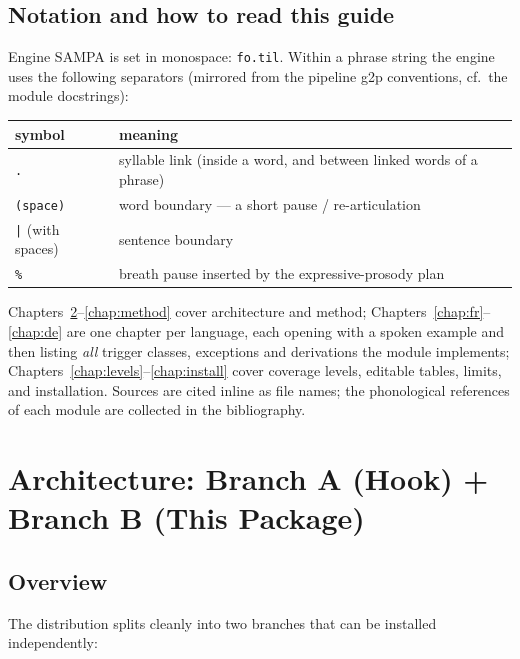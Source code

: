 \documentclass[11pt,a4paper]{report}
\newcommand{\smp}[1]{\texttt{#1}}          %
\begin{document}
\section{Notation and how to read this guide}

Engine SAMPA is set in monospace: \smp{fo.til}. Within a phrase string the
engine uses the following separators (mirrored from the pipeline g2p
conventions, cf.\ the module docstrings):

\begin{center}
\begin{tabular}{@{}ll@{}}
\toprule
symbol & meaning \\
\midrule
\smp{.} & syllable link (inside a word, and between linked words of a phrase) \\
\smp{(space)} & word boundary — a short pause / re-articulation \\
\smp{|} (with spaces) & sentence boundary \\
\smp{\%} & breath pause inserted by the expressive-prosody plan \\
\bottomrule
\end{tabular}
\end{center}

Chapters~\ref{chap:arch}–\ref{chap:method} cover architecture and method;
Chapters~\ref{chap:fr}–\ref{chap:de} are one chapter per language, each
opening with a spoken example and then listing \emph{all} trigger classes,
exceptions and derivations the module implements;
Chapters~\ref{chap:levels}–\ref{chap:install} cover coverage levels, editable
tables, limits, and installation. Sources are cited inline as file names; the
phonological references of each module are collected in the bibliography.

\chapter{Architecture: Branch A (Hook) + Branch B (This Package)}
\label{chap:arch}

\section{Overview}

The distribution splits cleanly into two branches that can be installed
independently:
\end{document}
